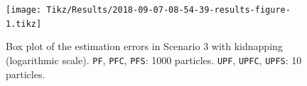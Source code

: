 %
%




\begin{figure}
	\centering
	\setlength\figureheight{0.9\textheight} 	
	\setlength{}		
	\texttt{[image: Tikz/Results/2018-09-07-08-54-39-results-figure-1.tikz]}			
	\caption[Box plot of the estimation errors in Scenario 3 with kidnapping. \texttt{PF}, \texttt{PFC}, \texttt{PFS}: 1000 particles. \texttt{UPF}, \texttt{UPFC}, \texttt{UPFS}: 10 particles.]{Box plot of the estimation errors in Scenario 3 with kidnapping (logarithmic scale). \texttt{PF}, \texttt{PFC}, \texttt{PFS}: 1000 particles. \texttt{UPF}, \texttt{UPFC}, \texttt{UPFS}: 10 particles.}		
	\label{fig:2018-09-07-08-54-39-results-figure-1}			
\end{figure}

